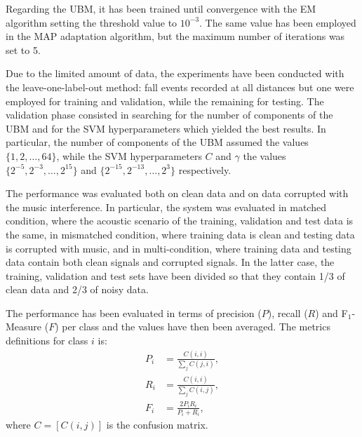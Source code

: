 Regarding the UBM, it has been trained until convergence with the EM algorithm setting the threshold value to $10^{-3}$. The same value has been employed in the MAP adaptation algorithm, but the maximum number of iterations was set to 5.

Due to the limited amount of data, the experiments have been conducted with the leave-one-label-out method: fall events recorded at all distances but one were employed for training and validation, while the remaining for testing. The validation phase consisted in searching for the number of components of the UBM and for the SVM hyperparameters which yielded the best results. In particular, the number of components of the UBM assumed the values $\{ 1,2,\ldots,64 \}$, while the SVM hyperparameters $C$ and $\gamma$ the values $\{ 2^{-5},2^{-3},\ldots,2^{15} \}$ and $\{ 2^{-15},2^{-13},\ldots,2^{3} \}$ respectively. 

The performance was evaluated both on clean data and on data corrupted with the music interference. In particular, the system was evaluated in matched condition, where the acoustic scenario of the training, validation and test data is the same, in mismatched condition, where training data is clean and testing data is corrupted with music, and in multi-condition, where training data and testing data contain both clean signals and corrupted signals. In the latter case, the training, validation and test sets have been divided so that they contain 1/3 of clean data and 2/3 of noisy data.

The performance has been evaluated in terms of precision ($P$), recall ($R$) and F$_1$-Measure ($F$) per class and the values have then been averaged. The metrics definitions for class $i$ is:
\begin{align}
P_i &=  \frac{C(i,i) }{\sum_j C(j,i)}, \\
R_i &=  \frac{C(i,i) }{\sum_j C(i,j)}, \\
F_{i} &= \frac{2P_iR_i}{P_i+R_i},
\end{align}
where $C=[C(i,j)]$ is the confusion matrix.


